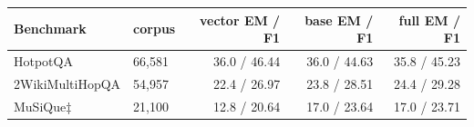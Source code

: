 \begin{tabular}{llrrr}
\toprule
Benchmark & corpus & vector EM / F1 & base EM / F1 & full EM / F1 \\
\midrule
HotpotQA & 66,581 & 36.0 / 46.44 & 36.0 / 44.63 & 35.8 / 45.23 \\
2WikiMultiHopQA & 54,957 & 22.4 / 26.97 & 23.8 / 28.51 & 24.4 / 29.28 \\
MuSiQue$\ddagger$ & 21,100 & 12.8 / 20.64 & 17.0 / 23.64 & 17.0 / 23.71 \\
\bottomrule
\end{tabular}
